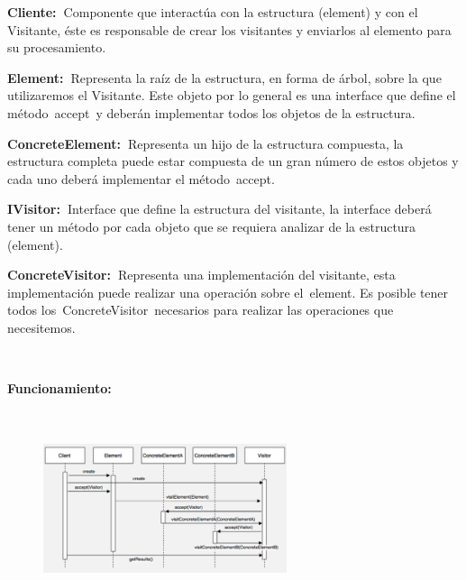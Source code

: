 \documentclass[12pt]{article}
\begin{document}
\begin{multicols}{2}
{\fontsize{9pt}{10.8pt}\selectfont \textbf{Cliente: }Componente que interactúa con la estructura (element) y con el Visitante, éste es responsable de crear los visitantes y enviarlos al elemento para su procesamiento. \par}\par

{\fontsize{9pt}{10.8pt}\selectfont \textbf{Element: }Representa la raíz de la estructura, en forma de árbol, sobre la que utilizaremos el Visitante. Este objeto por lo general es una interface que define el método accept y deberán implementar todos los objetos de la estructura. \par}\par

{\fontsize{9pt}{10.8pt}\selectfont \textbf{ConcreteElement: }Representa un hijo de la estructura compuesta, la estructura completa puede estar compuesta de un gran número de estos objetos y cada uno deberá implementar el método accept. \par}\par

{\fontsize{9pt}{10.8pt}\selectfont \textbf{IVisitor: }Interface que define la estructura del visitante, la interface deberá tener un método por cada objeto que se requiera analizar de la estructura (element). \par}\par

{\fontsize{9pt}{10.8pt}\selectfont \textbf{ConcreteVisitor: }Representa una implementación del visitante, esta implementación puede realizar una operación sobre el element. Es posible tener todos los ConcreteVisitor necesarios para realizar las operaciones que necesitemos. \par}\par

{\fontsize{9pt}{10.8pt}\selectfont  \par}\par

{\fontsize{9pt}{10.8pt}\selectfont \textbf{Funcionamiento:} \par}\par

{\fontsize{9pt}{10.8pt}\selectfont  \par}\par




\begin{figure}[H]
	\begin{Center}
		\includegraphics[width=2.81in,height=1.57in]{./media/image14.png}
	\end{Center}
\end{figure}



\end{multicols}
\end{document}

